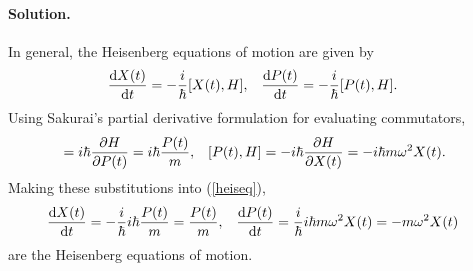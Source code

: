 \documentclass[11pt]{article}
\newcommand{\refeq}[1]{(\ref{#1})}
\newenvironment{solution}
{
    \paragraph{Solution.}
    \ignorespaces
}
{
}
\begin{document}
\begin{solution}
	In general, the Heisenberg equations of motion are given by
	\begin{align} \label{heiseq}
		\dv{X(t)}{t} &= -\frac{i}{\hbar} [X(t), H], &
		\dv{P(t)}{t} &= -\frac{i}{\hbar} [P(t), H].
	\end{align}
	Using Sakurai's partial derivative formulation for evaluating commutators,
	\begin{align}
		[\Xt, H] &= \ihb \pdv{H}{\Pt} = \ihb \frac{\Pt}{m}, &
		[\Pt, H] &= -\ihb \pdv{H}{\Xt} = -\ihb m \omega^2 \Xt.
	\end{align}
	Making these substitutions into \refeq{heiseq},
	\begin{align} \label{system}
		\dv{X(t)}{t} &= -\frac{i}{\hbar} i \hbar \frac{P(t)}{m} = \frac{P(t)}{m}, &
		\dv{P(t)}{t} &= \frac{i}{\hbar} i \hbar m \omega^2 X(t) = -m \omega^2 X(t)
	\end{align}
	are the Heisenberg equations of motion.
	

\end{solution}
\end{document}
